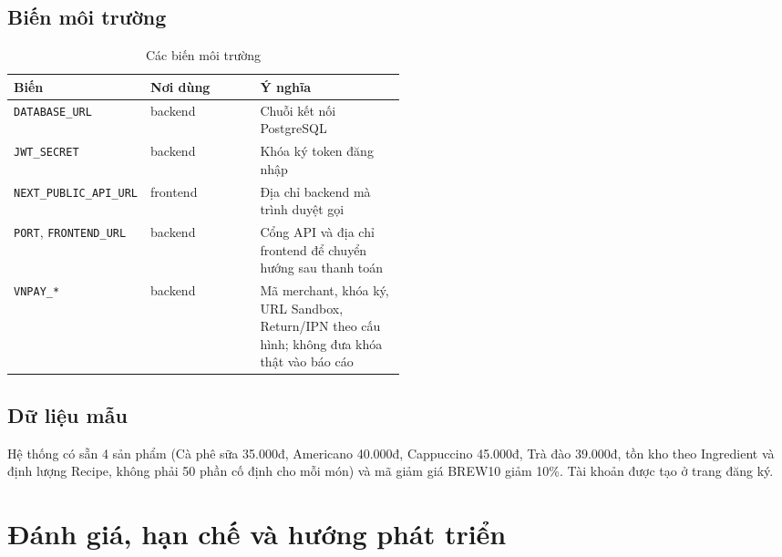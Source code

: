 \documentclass[a4paper]{article}
\begin{document}
\subsection{Biến môi trường}
\begin{table}[h!]
\centering
\footnotesize
\begin{tabularx}{\textwidth}{|p{0.22\linewidth}|p{0.28\linewidth}|X|}
\hline
\textbf{Biến} & \textbf{Nơi dùng} & \textbf{Ý nghĩa} \\ \hline
\texttt{DATABASE\_URL} & backend & Chuỗi kết nối PostgreSQL \\ \hline
\texttt{JWT\_SECRET} & backend & Khóa ký token đăng nhập \\ \hline
\texttt{NEXT\_PUBLIC\_API\_URL} & frontend & Địa chỉ backend mà trình duyệt gọi \\ \hline
\texttt{PORT}, \texttt{FRONTEND\_URL} & backend & Cổng API và địa chỉ frontend để chuyển hướng sau thanh toán \\ \hline
\texttt{VNPAY\_*} & backend & Mã merchant, khóa ký, URL Sandbox, Return/IPN theo cấu hình; không đưa khóa thật vào báo cáo \\ \hline
\end{tabularx}
\caption{Các biến môi trường}
\end{table}

\subsection{Dữ liệu mẫu}
Hệ thống có sẵn 4 sản phẩm (Cà phê sữa 35.000đ, Americano 40.000đ, Cappuccino 45.000đ, Trà đào 39.000đ, tồn kho theo Ingredient và định lượng Recipe, không phải 50 phần cố định cho mỗi món) và mã giảm giá BREW10 giảm 10\%. Tài khoản được tạo ở trang đăng ký.

\section{Đánh giá, hạn chế và hướng phát triển}
\end{document}
